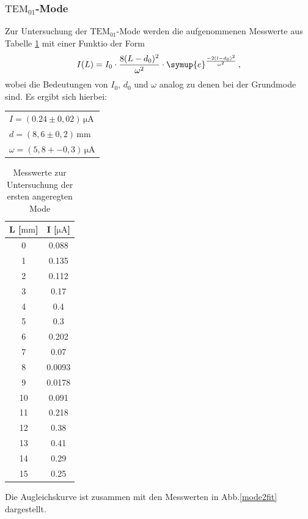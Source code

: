 \subsubsection{$\text{TEM}_{01}$-Mode}
Zur Untersuchung der $\text{TEM}_{01}$-Mode werden die aufgenommenen Messwerte aus Tabelle \ref{mode2} mit einer Funktio der Form
\begin{equation}
  I(L)=I_0\cdot\frac{8(L-d_0)^2}{\omega^2}\cdot\symup{e}^{\frac{-2(l-d_0)^2}{\omega^2}} \, ,
\end{equation}
wobei die Bedeutungen von $I_0$, $d_0$ und $\omega$ analog zu denen bei der Grundmode sind.
Es ergibt sich hierbei:
\begin{table}[]
  \centering
\begin{tabular}{l}
 $I=(0.24 \pm 0,02)\, \si{\micro\ampere}$\\
 $d=(8,6 \pm 0,2)\, \si{\milli\meter}$   \\
$\omega=(5,8 +- 0,3)\,  \si{\micro\ampere}$
\end{tabular}
\end{table}
\begin{table}[]
  \centering
\begin{tabular}{c|c}
L [$ \si{\milli\meter}$]   &   I [$ \si{\micro\ampere}$]     \\
  \hline
0  & 0.088  \\
1  & 0.135  \\
2  & 0.112  \\
3  & 0.17   \\
4  & 0.4    \\
5  & 0.3    \\
6  & 0.202  \\
7  & 0.07   \\
8  & 0.0093 \\
9  & 0.0178 \\
10 & 0.091  \\
11 & 0.218  \\
12 & 0.38   \\
13 & 0.41   \\
14 & 0.29   \\
15 & 0.25
\end{tabular}
\caption{Messwerte zur Untersuchung der ersten angeregten Mode}
\label{mode2}
\end{table}
Die Augleichskurve ist zusammen mit den Messwerten in Abb.\ref{mode2fit} dargestellt.
